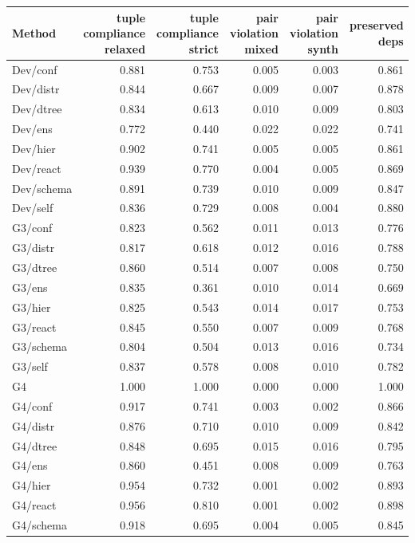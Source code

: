 \begin{table}[t]
\centering
\scriptsize
\setlength\tabcolsep{3pt}
\begin{tabular}{lrrrrr}
\toprule
\textbf{Method} & \textbf{tuple compliance relaxed} & \textbf{tuple compliance strict} & \textbf{pair violation mixed} & \textbf{pair violation synth} & \textbf{preserved deps} \\
\midrule
Dev/conf & 0.881 & 0.753 & 0.005 & 0.003 & 0.861 \\
Dev/distr & 0.844 & 0.667 & 0.009 & 0.007 & 0.878 \\
Dev/dtree & 0.834 & 0.613 & 0.010 & 0.009 & 0.803 \\
Dev/ens & 0.772 & 0.440 & 0.022 & 0.022 & 0.741 \\
Dev/hier & 0.902 & 0.741 & 0.005 & 0.005 & 0.861 \\
Dev/react & 0.939 & 0.770 & 0.004 & 0.005 & 0.869 \\
Dev/schema & 0.891 & 0.739 & 0.010 & 0.009 & 0.847 \\
Dev/self & 0.836 & 0.729 & 0.008 & 0.004 & 0.880 \\
G3/conf & 0.823 & 0.562 & 0.011 & 0.013 & 0.776 \\
G3/distr & 0.817 & 0.618 & 0.012 & 0.016 & 0.788 \\
G3/dtree & 0.860 & 0.514 & 0.007 & 0.008 & 0.750 \\
G3/ens & 0.835 & 0.361 & 0.010 & 0.014 & 0.669 \\
G3/hier & 0.825 & 0.543 & 0.014 & 0.017 & 0.753 \\
G3/react & 0.845 & 0.550 & 0.007 & 0.009 & 0.768 \\
G3/schema & 0.804 & 0.504 & 0.013 & 0.016 & 0.734 \\
G3/self & 0.837 & 0.578 & 0.008 & 0.010 & 0.782 \\
G4 & 1.000 & 1.000 & 0.000 & 0.000 & 1.000 \\
G4/conf & 0.917 & 0.741 & 0.003 & 0.002 & 0.866 \\
G4/distr & 0.876 & 0.710 & 0.010 & 0.009 & 0.842 \\
G4/dtree & 0.848 & 0.695 & 0.015 & 0.016 & 0.795 \\
G4/ens & 0.860 & 0.451 & 0.008 & 0.009 & 0.763 \\
G4/hier & 0.954 & 0.732 & 0.001 & 0.002 & 0.893 \\
G4/react & 0.956 & 0.810 & 0.001 & 0.002 & 0.898 \\
G4/schema & 0.918 & 0.695 & 0.004 & 0.005 & 0.845 \\

\end{tabular}
\end{table}
